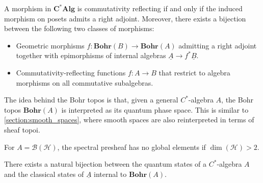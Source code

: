     \begin{property}\label{quantum:topos_morphisms}
        A morphism in $\mathbf{C^*Alg}$ is commutativity reflecting if and only if the induced morphism on posets admits a right adjoint. Moreover, there exists a bijection between the following two classes of morphisms:
        \begin{itemize}
            \item Geometric morphisms $f:\mathbf{Bohr}(B)\rightarrow\mathbf{Bohr}(A)$ admitting a right adjoint together with epimorphisms of internal algebras $\underline{A}\rightarrow f^*\underline{B}$.
            \item Commutativity-reflecting functions $f:A\rightarrow B$ that restrict to algebra morphisms on all commutative subalgebras.
        \end{itemize}
    \end{property}


    The idea behind the Bohr topos is that, given a general $C^*$-algebra $A$, the Bohr topos $\mathbf{Bohr}(A)$ is interpreted as its quantum phase space. This is similar to \cref{section:smooth_spaces}, where smooth spaces are also reinterpreted in terms of sheaf topoi.

    \begin{theorem}
        For $A=\mathcal{B}(\mathcal{H})$, the spectral presheaf has no global elements if $\dim(\mathcal{H})>2$.
    \end{theorem}

    \begin{property}
        There exists a natural bijection between the quantum states of a $C^*$-algebra $A$ and the classical states of $\underline{A}$ internal to $\mathbf{Bohr}(A)$.
    \end{property}

